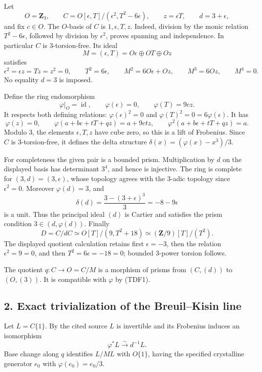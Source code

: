 \documentclass[
  10pt,
]{article}
\begin{document}
Let \[
 O=\mathbf Z_3,\qquad
 C=O[\epsilon,T]/(\epsilon^2,T^2-6\epsilon),\qquad
 z=\epsilon T,\qquad
 d=3+\epsilon,
\] and fix \(c\in O\). The \(O\)-basis of \(C\) is \(1,\epsilon,T,z\).
Indeed, division by the monic relation \(T^2-6\epsilon\), followed by
division by \(\epsilon^2\), proves spanning and independence. In
particular \(C\) is \(3\)-torsion-free. Its ideal \[
 M=(\epsilon,T)=O\epsilon\oplus OT\oplus Oz
\] satisfies \[
 \epsilon^2=\epsilon z=Tz=z^2=0,\qquad T^2=6\epsilon,
 \qquad M^2=6O\epsilon+Oz,\qquad M^3=6Oz,\qquad M^4=0.
\] No equality \(d=3\) is imposed.

Define the ring endomorphism \[
 \varphi|_O=\operatorname{id},\qquad
 \varphi(\epsilon)=0,\qquad
 \varphi(T)=9cz.
\] It respects both defining relations: \(\varphi(\epsilon)^2=0\) and
\(\varphi(T)^2=0=6\varphi(\epsilon)\). It has \[
 \varphi(z)=0,\qquad
 \varphi(a+b\epsilon+tT+qz)=a+9ctz,\qquad
 \varphi^2(a+b\epsilon+tT+qz)=a.
 \tag{TDF1}
\] Modulo \(3\), the elements \(\epsilon,T,z\) have cube zero, so this
is a lift of Frobenius. Since \(C\) is \(3\)-torsion-free, it defines
the delta structure \(\delta(x)=(\varphi(x)-x^3)/3\).

For completeness the given pair is a bounded prism. Multiplication by
\(d\) on the displayed basis has determinant \(3^4\), and hence is
injective. The ring is complete for \((3,d)=(3,\epsilon)\), whose
topology agrees with the \(3\)-adic topology since \(\epsilon^2=0\).
Moreover \(\varphi(d)=3\), and \[
 \delta(d)=\frac{3-(3+\epsilon)^3}{3}=-8-9\epsilon
\] is a unit. Thus the principal ideal \((d)\) is Cartier and satisfies
the prism condition \(3\in(d,\varphi(d))\). Finally \[
 D=C/dC
 \simeq O[T]/(9,T^2+18)
 \simeq (\mathbf Z/9)[T]/(T^2).
 \tag{TDF2}
\] The displayed quotient calculation retains first \(\epsilon=-3\),
then the relation \(\epsilon^2=9=0\), and then \(T^2=6\epsilon=-18=0\);
bounded \(3\)-power torsion follows.

The quotient \(q:C\to O=C/M\) is a morphism of prisms from \((C,(d))\)
to \((O,(3))\). It is compatible with \(\varphi\) by (TDF1).

\subsection{2. Exact trivialization of the Breuil--Kisin
line}\label{exact-trivialization-of-the-breuilkisin-line}

Let \(L=C\{1\}\). By the cited source \(L\) is invertible and its
Frobenius induces an isomorphism \[
 \varphi^*L\xrightarrow{\sim}d^{-1}L.
\] Base change along \(q\) identifies \(L/ML\) with \(O\{1\}\), having
the specified crystalline generator \(e_0\) with \(\varphi(e_0)=e_0/3\).
\end{document}
